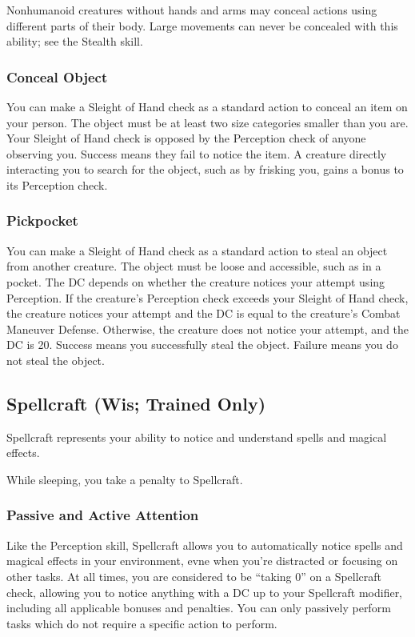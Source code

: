 Nonhumanoid creatures without hands and arms may conceal actions using different parts of their body. Large movements can never be concealed with this ability; see the Stealth skill.

\subsubsection{Conceal Object}
You can make a Sleight of Hand check as a standard action to conceal an item on your person. The object must be at least two size categories smaller than you are. Your Sleight of Hand check is opposed by the Perception check of anyone observing you. Success means they fail to notice the item. A creature directly interacting you to search for the object, such as by frisking you, gains a  bonus to its Perception check.

\subsubsection{Pickpocket}
You can make a Sleight of Hand check as a standard action to steal an object from another creature. The object must be loose and accessible, such as in a pocket. The DC depends on whether the creature notices your attempt using Perception. If the creature's Perception check exceeds your Sleight of Hand check, the creature notices your attempt and the DC is equal to the creature's Combat Maneuver Defense. Otherwise, the creature does not notice your attempt, and the DC is 20. Success means you successfully steal the object. Failure means you do not steal the object.

\subsection{Spellcraft (Wis; Trained Only)}
Spellcraft represents your ability to notice and understand spells and magical effects.

While sleeping, you take a  penalty to Spellcraft.

\subsubsection{Passive and Active Attention}\label{Spellcraft:Passive and Active Attention}
Like the Perception skill, Spellcraft allows you to automatically notice spells and magical effects in your environment, evne when you're distracted or focusing on other tasks. At all times, you are considered to be ``taking 0'' on a Spellcraft check, allowing you to notice anything with a DC up to your Spellcraft modifier, including all applicable bonuses and penalties. You can only passively perform tasks which do not require a specific action to perform.

